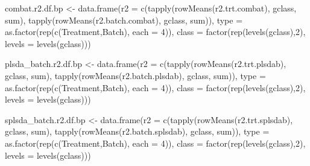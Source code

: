 \documentclass[
]{book}
\newenvironment{Shaded}{\begin{snugshade}}{\end{snugshade}}
\newcommand{\AttributeTok}[1]{\textcolor[rgb]{0.77,0.63,0.00}{#1}}
\newcommand{\DecValTok}[1]{\textcolor[rgb]{0.00,0.00,0.81}{#1}}
\newcommand{\FunctionTok}[1]{\textcolor[rgb]{0.00,0.00,0.00}{#1}}
\newcommand{\NormalTok}[1]{#1}
\newcommand{\OtherTok}[1]{\textcolor[rgb]{0.56,0.35,0.01}{#1}}
\newcommand{\StringTok}[1]{\textcolor[rgb]{0.31,0.60,0.02}{#1}}
\begin{document}
\begin{Shaded}
\begin{Highlighting}[]
\NormalTok{combat.r2.df.bp }\OtherTok{\textless{}{-}} 
  \FunctionTok{data.frame}\NormalTok{(}\AttributeTok{r2 =} \FunctionTok{c}\NormalTok{(}\FunctionTok{tapply}\NormalTok{(}\FunctionTok{rowMeans}\NormalTok{(r2.trt.combat), gclass, sum), }
                    \FunctionTok{tapply}\NormalTok{(}\FunctionTok{rowMeans}\NormalTok{(r2.batch.combat), gclass, sum)), }
             \AttributeTok{type =} \FunctionTok{as.factor}\NormalTok{(}\FunctionTok{rep}\NormalTok{(}\FunctionTok{c}\NormalTok{(}\StringTok{\textquotesingle{}Treatment\textquotesingle{}}\NormalTok{,}\StringTok{\textquotesingle{}Batch\textquotesingle{}}\NormalTok{), }\AttributeTok{each =} \DecValTok{4}\NormalTok{)),}
             \AttributeTok{class =} \FunctionTok{factor}\NormalTok{(}\FunctionTok{rep}\NormalTok{(}\FunctionTok{levels}\NormalTok{(gclass),}\DecValTok{2}\NormalTok{), }\AttributeTok{levels =} \FunctionTok{levels}\NormalTok{(gclass)))}

\NormalTok{plsda\_batch.r2.df.bp }\OtherTok{\textless{}{-}} 
  \FunctionTok{data.frame}\NormalTok{(}\AttributeTok{r2 =} \FunctionTok{c}\NormalTok{(}\FunctionTok{tapply}\NormalTok{(}\FunctionTok{rowMeans}\NormalTok{(r2.trt.plsdab), gclass, sum), }
                    \FunctionTok{tapply}\NormalTok{(}\FunctionTok{rowMeans}\NormalTok{(r2.batch.plsdab), gclass, sum)), }
             \AttributeTok{type =} \FunctionTok{as.factor}\NormalTok{(}\FunctionTok{rep}\NormalTok{(}\FunctionTok{c}\NormalTok{(}\StringTok{\textquotesingle{}Treatment\textquotesingle{}}\NormalTok{,}\StringTok{\textquotesingle{}Batch\textquotesingle{}}\NormalTok{), }\AttributeTok{each =} \DecValTok{4}\NormalTok{)),}
             \AttributeTok{class =} \FunctionTok{factor}\NormalTok{(}\FunctionTok{rep}\NormalTok{(}\FunctionTok{levels}\NormalTok{(gclass),}\DecValTok{2}\NormalTok{), }\AttributeTok{levels =} \FunctionTok{levels}\NormalTok{(gclass)))}

\NormalTok{splsda\_batch.r2.df.bp }\OtherTok{\textless{}{-}} 
  \FunctionTok{data.frame}\NormalTok{(}\AttributeTok{r2 =} \FunctionTok{c}\NormalTok{(}\FunctionTok{tapply}\NormalTok{(}\FunctionTok{rowMeans}\NormalTok{(r2.trt.splsdab), gclass, sum), }
                    \FunctionTok{tapply}\NormalTok{(}\FunctionTok{rowMeans}\NormalTok{(r2.batch.splsdab), gclass, sum)), }
             \AttributeTok{type =} \FunctionTok{as.factor}\NormalTok{(}\FunctionTok{rep}\NormalTok{(}\FunctionTok{c}\NormalTok{(}\StringTok{\textquotesingle{}Treatment\textquotesingle{}}\NormalTok{,}\StringTok{\textquotesingle{}Batch\textquotesingle{}}\NormalTok{), }\AttributeTok{each =} \DecValTok{4}\NormalTok{)),}
             \AttributeTok{class =} \FunctionTok{factor}\NormalTok{(}\FunctionTok{rep}\NormalTok{(}\FunctionTok{levels}\NormalTok{(gclass),}\DecValTok{2}\NormalTok{), }\AttributeTok{levels =} \FunctionTok{levels}\NormalTok{(gclass)))}



\end{Highlighting}
\end{Shaded}
\end{document}
